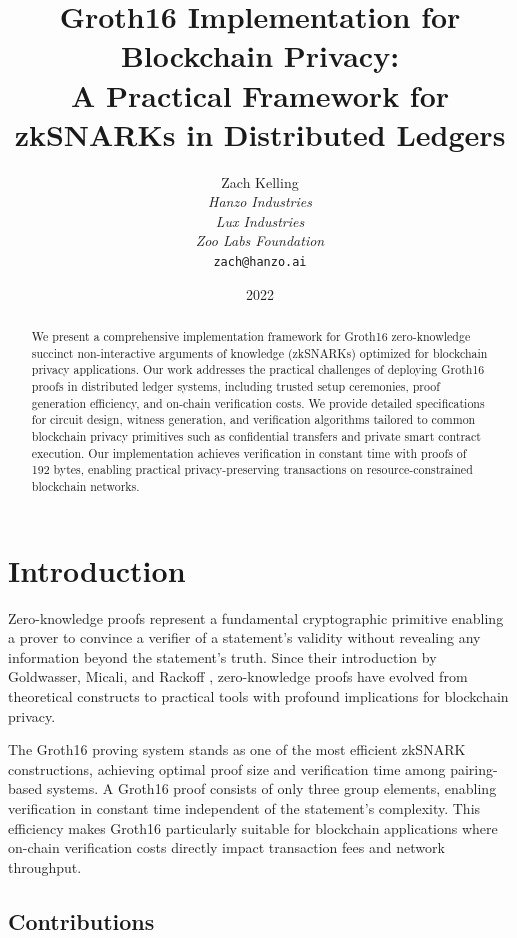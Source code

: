 \documentclass[11pt,a4paper]{article}
\title{Groth16 Implementation for Blockchain Privacy:\\
A Practical Framework for zkSNARKs in Distributed Ledgers}
\author{Zach Kelling\\
\textit{Hanzo Industries}\\
\textit{Lux Industries}\\
\textit{Zoo Labs Foundation}\\
\texttt{zach@hanzo.ai}}
\date{2022}
\begin{document}
\maketitle

\begin{abstract}
We present a comprehensive implementation framework for Groth16 zero-knowledge succinct non-interactive arguments of knowledge (zkSNARKs) optimized for blockchain privacy applications. Our work addresses the practical challenges of deploying Groth16 proofs in distributed ledger systems, including trusted setup ceremonies, proof generation efficiency, and on-chain verification costs. We provide detailed specifications for circuit design, witness generation, and verification algorithms tailored to common blockchain privacy primitives such as confidential transfers and private smart contract execution. Our implementation achieves verification in constant time with proofs of 192 bytes, enabling practical privacy-preserving transactions on resource-constrained blockchain networks.
\end{abstract}

\section{Introduction}

Zero-knowledge proofs represent a fundamental cryptographic primitive enabling a prover to convince a verifier of a statement's validity without revealing any information beyond the statement's truth. Since their introduction by Goldwasser, Micali, and Rackoff \cite{gmr85}, zero-knowledge proofs have evolved from theoretical constructs to practical tools with profound implications for blockchain privacy.

The Groth16 proving system \cite{groth16} stands as one of the most efficient zkSNARK constructions, achieving optimal proof size and verification time among pairing-based systems. A Groth16 proof consists of only three group elements, enabling verification in constant time independent of the statement's complexity. This efficiency makes Groth16 particularly suitable for blockchain applications where on-chain verification costs directly impact transaction fees and network throughput.

\subsection{Contributions}
\end{document}
